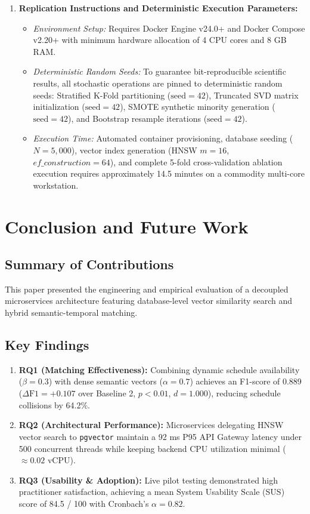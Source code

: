 \documentclass[a4paper,fleqn]{cas-dc}
\begin{document}
\begin{enumerate}
    \item \textbf{Replication Instructions and Deterministic Execution Parameters:}
    \begin{itemize}
        \item \textit{Environment Setup:} Requires Docker Engine v24.0+ and Docker Compose v2.20+ with minimum hardware allocation of 4 CPU cores and 8 GB RAM.
        \item \textit{Deterministic Random Seeds:} To guarantee bit-reproducible scientific results, all stochastic operations are pinned to deterministic random seeds: Stratified K-Fold partitioning ($\text{seed} = 42$), Truncated SVD matrix initialization ($\text{seed} = 42$), SMOTE synthetic minority generation ($\text{seed} = 42$), and Bootstrap resample iterations ($\text{seed} = 42$).
        \item \textit{Execution Time:} Automated container provisioning, database seeding ($N = 5,000$), vector index generation (HNSW $m = 16$, $ef\_construction = 64$), and complete 5-fold cross-validation ablation execution requires approximately 14.5 minutes on a commodity multi-core workstation.
    \end{itemize}
\end{enumerate}

\section{Conclusion and Future Work}
\label{sec:conclusion}

\subsection{Summary of Contributions}
This paper presented the engineering and empirical evaluation of a decoupled microservices architecture featuring database-level vector similarity search and hybrid semantic-temporal matching.

\subsection{Key Findings}
\begin{enumerate}
    \item \textbf{RQ1 (Matching Effectiveness):} Combining dynamic schedule availability ($\beta = 0.3$) with dense semantic vectors ($\alpha = 0.7$) achieves an F1-score of 0.889 ($\Delta\text{F1} = +0.107$ over Baseline 2, $p < 0.01$, $d = 1.000$), reducing schedule collisions by 64.2\%.
    \item \textbf{RQ2 (Architectural Performance):} Microservices delegating HNSW vector search to \texttt{pgvector} maintain a 92 ms P95 API Gateway latency under 500 concurrent threads while keeping backend CPU utilization minimal ($\approx 0.02$ vCPU).
    \item \textbf{RQ3 (Usability \& Adoption):} Live pilot testing demonstrated high practitioner satisfaction, achieving a mean System Usability Scale (SUS) score of 84.5 / 100 with Cronbach's $\alpha = 0.82$.
\end{enumerate}
\end{document}
